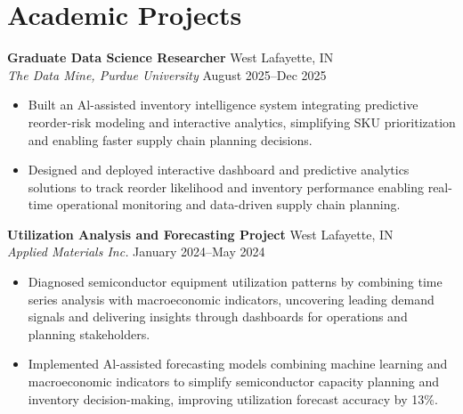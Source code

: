 \documentclass[11pt,a4paper]{article}
\begin{document}
\section*{Academic Projects}  
\noindent
\textbf{Graduate Data Science Researcher} \hfill West Lafayette, IN   \\
\textit{The Data Mine, Purdue University} \hfill August 2025--Dec 2025  
\begin{itemize}[leftmargin=*, noitemsep, topsep=0pt]
    \item Built an Al-assisted inventory intelligence system integrating predictive reorder-risk modeling and interactive analytics, simplifying SKU prioritization and enabling faster supply chain planning decisions.  
    \item Designed and deployed interactive dashboard and predictive analytics solutions to track reorder likelihood and inventory performance enabling real-time operational monitoring and data-driven supply chain planning.  
\end{itemize}
\vspace{6pt}

\noindent
\textbf{Utilization Analysis and Forecasting Project} \hfill West Lafayette, IN   \\
\textit{Applied Materials Inc.} \hfill January 2024--May 2024  
\begin{itemize}[leftmargin=*, noitemsep, topsep=0pt]
    \item Diagnosed semiconductor equipment utilization patterns by combining time series analysis with macroeconomic indicators, uncovering leading demand signals and delivering insights through dashboards for operations and planning stakeholders.  
    \item Implemented Al-assisted forecasting models combining machine learning and macroeconomic indicators to simplify semiconductor capacity planning and inventory decision-making, improving utilization forecast accuracy by 13\%.  
\end{itemize}
\end{document}
